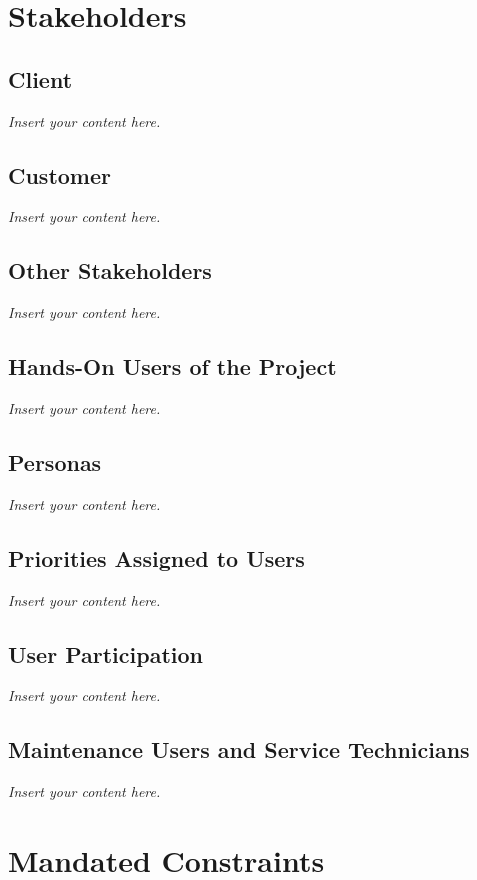 \documentclass[12pt]{article}
\newcommand{\lips}{\textit{Insert your content here.}}
\begin{document}
\section{Stakeholders}
\subsection{Client}
\lips
\subsection{Customer}
\lips
\subsection{Other Stakeholders}
\lips
\subsection{Hands-On Users of the Project}
\lips
\subsection{Personas}
\lips
\subsection{Priorities Assigned to Users}
\lips
\subsection{User Participation}
\lips
\subsection{Maintenance Users and Service Technicians}
\lips

\section{Mandated Constraints}
\end{document}
